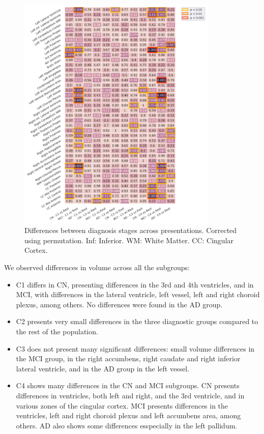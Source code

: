 \begin{figure}[!htbp]
\centering
\includegraphics[width=0.85\textwidth]{figures/cimlr/groupsdxcluster_againstrest.png}
\caption[Diagnosis interaction analysis.]{Differences between diagnosis stages across presentations. Corrected using permutation. Inf: Inferior. WM: White Matter. CC: Cingular Cortex.}
\label{dxcluster_againstrest}
\end{figure}

We observed differences in volume across all the subgroups:

\begin{itemize}
    \item C1 differs in CN, presenting differences in the 3rd and 4th ventricles, and in MCI, with differences in the lateral ventricle, left vessel, left and right choroid plexus, among others. No differences were found in the AD group.
    \item C2 presents very small differences in the three diagnostic groups compared to the rest of the population.
    \item C3 does not present many significant differences: small volume differences in the MCI group, in the right accumbens, right caudate and right inferior lateral ventricle, and in the AD group in the left vessel. 
    \item C4 shows many differences in the CN and MCI subgroups. CN presents differences in ventricles, both left and right, and the 3rd ventricle, and in various zones of the cingular cortex. MCI presents differences in the ventricles, left and right choroid plexus and left accumbens area, among others. AD also shows some differences esspecially in the left pallidum.
\end{itemize}

